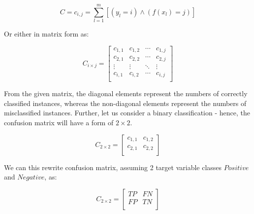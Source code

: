 \begin{equation}\label{eq}
C = {c_{i,j} = \sum_{l=1}^{m}[(y_l=i) \land (f(x_l)=j)]}
\end{equation}

Or either in matrix form as:

\begin{equation}\label{eq}
    C_{i \times j} = \begin{bmatrix}
    c_{1,1} & c_{1,2} & \cdots & c_{1,j} \\
    c_{2,1} & c_{2,2} & \cdots & c_{2,j} \\
    \vdots & \vdots & \ddots & \vdots \\
    c_{i,1} & c_{i,2} & \cdots & c_{i,j} \\
    \end{bmatrix}
\end{equation}

From the given matrix, the diagonal elements represent the numbers of correctly classified instances, whereas the non-diagonal elements represent the numbers of misclassified instances.
Further, let us consider a binary classification - hence, the confusion matrix will have a form of $2\times 2$.

\begin{equation}
    C_{2 \times 2} = \begin{bmatrix}
    c_{1,1} & c_{1,2} \\
    c_{2,1} & c_{2,2} \\
    \end{bmatrix}
\end{equation}


We can this rewrite confusion matrix, assuming 2 target variable classes $Positive$ and $Negative$, as:

\begin{equation}
    C_{2 \times 2} = \begin{bmatrix}
    TP & FN \\
    FP & TN \\
    \end{bmatrix}
\end{equation}

